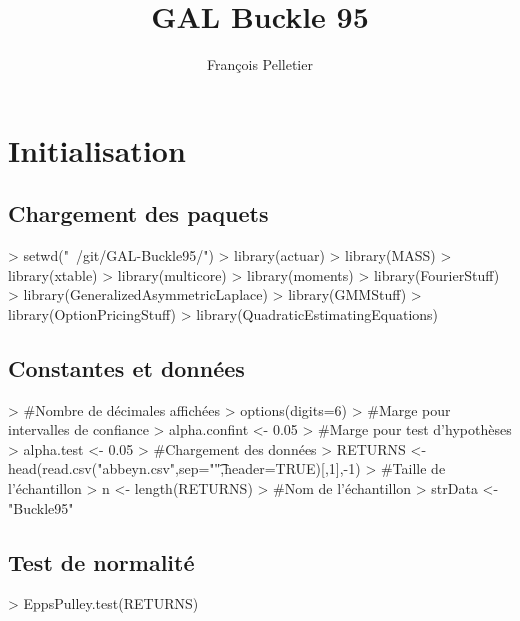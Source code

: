 \documentclass[letter]{report}
\begin{document}


\title{GAL Buckle 95}
\author{François Pelletier}
\maketitle
\tableofcontents

\chapter{Initialisation}

\section{Chargement des paquets}
\begin{Schunk}
\begin{Sinput}
> setwd("~/git/GAL-Buckle95/")
> library(actuar)
> library(MASS)
> library(xtable)
> library(multicore)
> library(moments)
> library(FourierStuff)
> library(GeneralizedAsymmetricLaplace)
> library(GMMStuff)
> library(OptionPricingStuff)
> library(QuadraticEstimatingEquations)
\end{Sinput}
\end{Schunk}

\section{Constantes et données}

\begin{Schunk}
\begin{Sinput}
> #Nombre de décimales affichées
> options(digits=6)
> #Marge pour intervalles de confiance
> alpha.confint <- 0.05 
> #Marge pour test d'hypothèses
> alpha.test <- 0.05
> #Chargement des données
> RETURNS <- head(read.csv("abbeyn.csv",sep="\t",header=TRUE)[,1],-1)
> #Taille de l'échantillon
> n <- length(RETURNS)
> #Nom de l'échantillon
> strData <- "Buckle95"
\end{Sinput}
\end{Schunk}

\section{Test de normalité}

\begin{Schunk}
\begin{Sinput}
> EppsPulley.test(RETURNS)
\end{Sinput}
\end{Schunk}
\end{document}
